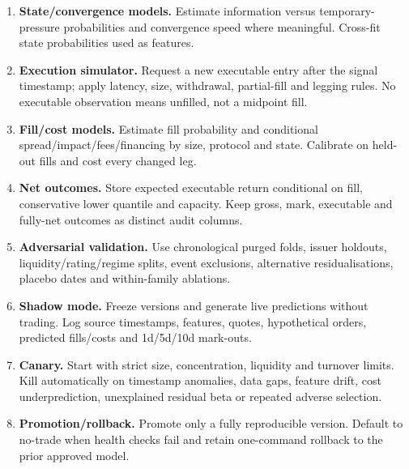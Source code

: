 \documentclass[10pt]{article}
\begin{document}
\begin{enumerate}[leftmargin=2em,label=\textbf{A\arabic*.}]
\item \textbf{State/convergence models.} Estimate information versus temporary-pressure probabilities and convergence speed where meaningful. Cross-fit state probabilities used as features.
\item \textbf{Execution simulator.} Request a new executable entry after the signal timestamp; apply latency, size, withdrawal, partial-fill and legging rules. No executable observation means unfilled, not a midpoint fill.
\item \textbf{Fill/cost models.} Estimate fill probability and conditional spread/impact/fees/financing by size, protocol and state. Calibrate on held-out fills and cost every changed leg.
\item \textbf{Net outcomes.} Store expected executable return conditional on fill, conservative lower quantile and capacity. Keep gross, mark, executable and fully-net outcomes as distinct audit columns.
\item \textbf{Adversarial validation.} Use chronological purged folds, issuer holdouts, liquidity/rating/regime splits, event exclusions, alternative residualisations, placebo dates and within-family ablations.
\item \textbf{Shadow mode.} Freeze versions and generate live predictions without trading. Log source timestamps, features, quotes, hypothetical orders, predicted fills/costs and 1d/5d/10d mark-outs.
\item \textbf{Canary.} Start with strict size, concentration, liquidity and turnover limits. Kill automatically on timestamp anomalies, data gaps, feature drift, cost underprediction, unexplained residual beta or repeated adverse selection.
\item \textbf{Promotion/rollback.} Promote only a fully reproducible version. Default to no-trade when health checks fail and retain one-command rollback to the prior approved model.
\end{enumerate}
\end{document}
